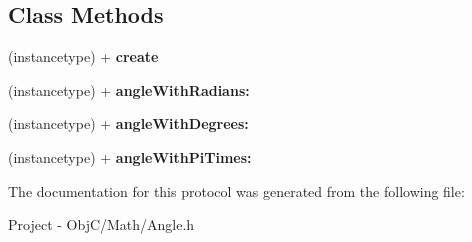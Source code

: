 \subsection*{Class Methods}
\begin{DoxyCompactItemize}
\item 
\hypertarget{protocol_angle_export-p_a2734198f273e2d1ce26778215474f485}{}(instancetype) + {\bfseries create}\label{protocol_angle_export-p_a2734198f273e2d1ce26778215474f485}

\item 
\hypertarget{protocol_angle_export-p_a21cccf20c1ac268fc3563db450db954b}{}(instancetype) + {\bfseries angle\+With\+Radians\+:}\label{protocol_angle_export-p_a21cccf20c1ac268fc3563db450db954b}

\item 
\hypertarget{protocol_angle_export-p_abef731774c00598303a7b64b8964345d}{}(instancetype) + {\bfseries angle\+With\+Degrees\+:}\label{protocol_angle_export-p_abef731774c00598303a7b64b8964345d}

\item 
\hypertarget{protocol_angle_export-p_a8e75fd95ab3cb152c43ccb6017d2dd60}{}(instancetype) + {\bfseries angle\+With\+Pi\+Times\+:}\label{protocol_angle_export-p_a8e75fd95ab3cb152c43ccb6017d2dd60}

\end{DoxyCompactItemize}


The documentation for this protocol was generated from the following file\+:\begin{DoxyCompactItemize}
\item 
Project -\/ Obj\+C/\+Math/Angle.\+h\end{DoxyCompactItemize}
